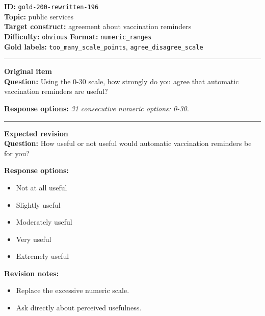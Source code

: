 \documentclass[10pt,a4paper]{article}
\newcommand{\sectionline}{\vspace{0.15em}\hrule\vspace{0.35em}}
\begin{document}
\begin{tcolorbox}[colframe=FlawRed,colback=white,colbacktitle=FlawRed!9,coltitle=black,title={Item 196\hfill Flawed item}]
\textbf{ID:} \texttt{gold-200-rewritten-196}\\
\textbf{Topic:} public services\\
\textbf{Target construct:} agreement about vaccination reminders\\
\textbf{Difficulty:} \texttt{obvious} \quad \textbf{Format:} \texttt{numeric\_ranges}\\
\textbf{Gold labels:} \texttt{too\_many\_scale\_points}, \texttt{agree\_disagree\_scale}\\
\sectionline
\textbf{Original item}\\
\textbf{Question:} Using the 0-30 scale, how strongly do you agree that automatic vaccination reminders are useful?
\par\textbf{Response options:}
\textit{31 consecutive numeric options: 0-30.}
\sectionline
\textbf{Expected revision}\\
\textbf{Question:} How useful or not useful would automatic vaccination reminders be for you?
\par\textbf{Response options:}
\begin{itemize}
\item Not at all useful
\item Slightly useful
\item Moderately useful
\item Very useful
\item Extremely useful
\end{itemize}
\par\textbf{Revision notes:}
\begin{itemize}
\item Replace the excessive numeric scale.
\item Ask directly about perceived usefulness.
\end{itemize}
\end{tcolorbox}
\end{document}
